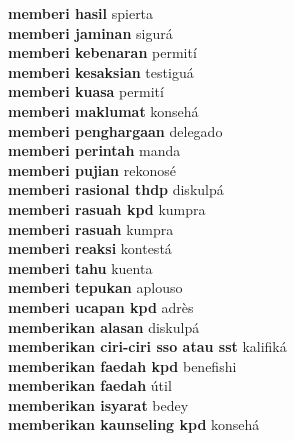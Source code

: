 \textbf{ memberi hasil  } spierta \\
\textbf{ memberi jaminan  } sigurá \\
\textbf{ memberi kebenaran  } permití \\
\textbf{ memberi kesaksian  } testiguá \\
\textbf{ memberi kuasa  } permití \\
\textbf{ memberi maklumat  } konsehá \\
\textbf{ memberi penghargaan  } delegado \\
\textbf{ memberi perintah  } manda \\
\textbf{ memberi pujian  } rekonosé \\
\textbf{ memberi rasional thdp  } diskulpá \\
\textbf{ memberi rasuah kpd  } kumpra \\
\textbf{ memberi rasuah  } kumpra \\
\textbf{ memberi reaksi  } kontestá \\
\textbf{ memberi tahu  } kuenta \\
\textbf{ memberi tepukan  } aplouso \\
\textbf{ memberi ucapan kpd  } adrès \\
\textbf{ memberikan alasan  } diskulpá \\
\textbf{ memberikan ciri-ciri sso atau sst  } kalifiká \\
\textbf{ memberikan faedah kpd  } benefishi \\
\textbf{ memberikan faedah  } útil \\
\textbf{ memberikan isyarat  } bedey \\
\textbf{ memberikan kaunseling kpd  } konsehá \\
